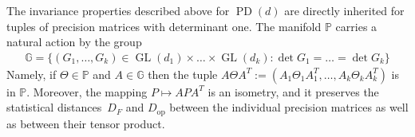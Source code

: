 \documentclass[aos]{imsart}
\theoremstyle{definition}
\numberwithin{equation}{section}
\DeclareMathOperator{\op}{op}
\DeclareMathOperator{\GL}{GL}
\DeclareMathOperator{\PD}{PD}
\newcommand{\R}{{\mathbb{R}}}
\renewcommand{\P}{{\mathbb{P}}}
\newcommand{\G}{{\mathbb{G}}}
\newcommand{\ot}{\otimes}
\newcommand{\samp}{x}
\newcommand{\rv}{X}
\newcommand{\CF}[1]{{\color{purple}[CF: #1]}}
\newcommand{\MW}[1]{{\color{red}[MW: #1]}}
\begin{document}
The invariance properties described above for $\PD(d)$ are directly inherited for tuples of precision matrices with determinant one.
The manifold $\P$ carries a natural action by the group
\begin{align*}
  \G = \{ (G_1,\dots,G_k) \in  \GL(d_1) \times \dots \times \GL(d_k): \det G_1= \dots = \det G_k \}
\end{align*}
Namely, if $\Theta \in \P$ and $A \in \G$ then the tuple $A \Theta A^T := (A_1 \Theta_1 A_1^T, \dots, A_k \Theta_k A_k^T)$ is in $\P$. Moreover, the mapping $P \mapsto AP A^T$ is an isometry, and it preserves the statistical distances~$D_F$ and $D_{\op}$ between the individual precision matrices as well as between their tensor product.


\end{document}
